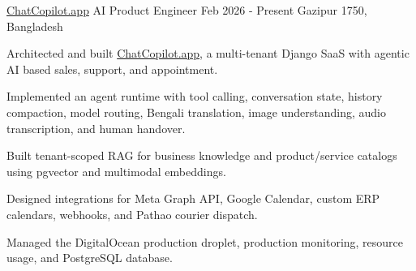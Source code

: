\begin{cventries}

\cventry
    {\href{https://chatcopilot.app/}{ChatCopilot.app}} %
    {AI Product Engineer} %
    {Feb 2026 - Present} %
    {Gazipur 1750, Bangladesh} %
    {
      \begin{cvitems}
        \item{Architected and built \href{https://chatcopilot.app/}{ChatCopilot.app}, a multi-tenant Django SaaS with agentic AI based sales, support, and appointment.}
        \item{Implemented an agent runtime with tool calling, conversation state, history compaction, model routing, Bengali translation, image understanding, audio transcription, and human handover.}
        \item{Built tenant-scoped RAG for business knowledge and product/service catalogs using pgvector and multimodal embeddings.}
        \item{Designed integrations for Meta Graph API, Google Calendar, custom ERP calendars, webhooks, and Pathao courier dispatch.}
        \item{Managed the DigitalOcean production droplet, production monitoring, resource usage, and PostgreSQL database.}
      \end{cvitems}
    }


\end{cventries}
